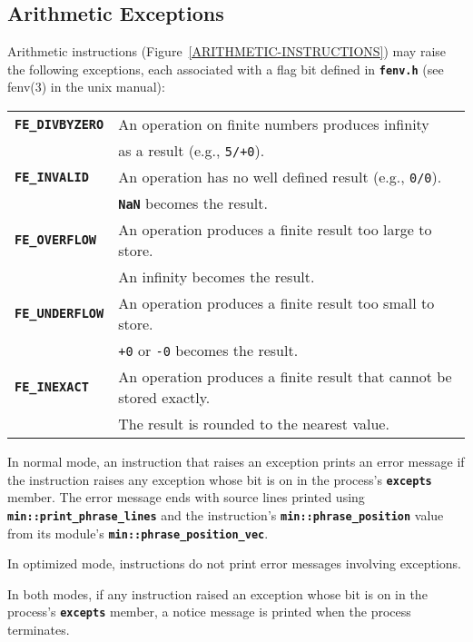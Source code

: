 \documentclass[12pt]{article}
\makeatletter
\newcommand{\TT}[1]{{\tt \bfseries #1}}
\newcommand{\ttkey}[1]{\TT{#1}\index{#1@{\tt #1}}}
\newcommand{\EOL}{\penalty \exhyphenpenalty}
\makeatother
\begin{document}
\subsection{Arithmetic Exceptions}
\label{ARITHMETIC-EXCEPTIONS}

Arithmetic instructions (Figure~\ref{ARITHMETIC-INSTRUCTIONS})
may raise the following exceptions, each
associated with a flag bit defined in \TT{fenv.h}
(see fenv(3) in the unix manual):
\begin{center}
\begin{tabular}{|l|l|}
\hline
\ttkey{FE\_DIVBYZERO} &  An operation on finite numbers produces infinity \\
                      &  as a result (e.g., {\tt 5/+0}).
\\\hline
\ttkey{FE\_INVALID} & An operation has no well defined result
                      (e.g., {\tt 0/0}). \\
		    & \TT{NaN} becomes the result.
\\\hline
\ttkey{FE\_OVERFLOW} & An operation produces a finite result too large to
                       store. \\
		     & An infinity becomes the result.
\\\hline
\ttkey{FE\_UNDERFLOW} & An operation produces a finite result too small to
                        store. \\
	              & {\tt +0} or {\tt -0} becomes the result.
\\\hline
\ttkey{FE\_INEXACT} & An operation produces a finite result that cannot
                      be stored exactly. \\
		    & The result is rounded to the nearest value.
\\\hline
\end{tabular}
\end{center}

In normal mode, an instruction that raises an exception prints
an error message if the instruction raises any exception whose bit
is on in the process's \TT{excepts} member.
The error message ends with source lines printed
using \TT{min::\EOL print\_\EOL phrase\_\EOL lines} and the
instruction's \TT{min::phrase\_\EOL position} value from its module's
\TT{min::phrase\_\EOL position\_\EOL vec}.

In optimized mode, instructions do not print error messages
involving exceptions.

In both modes, if any instruction raised an exception whose bit
is on in the process's \TT{excepts} member, a notice message is
printed when the process terminates.
\end{document}
